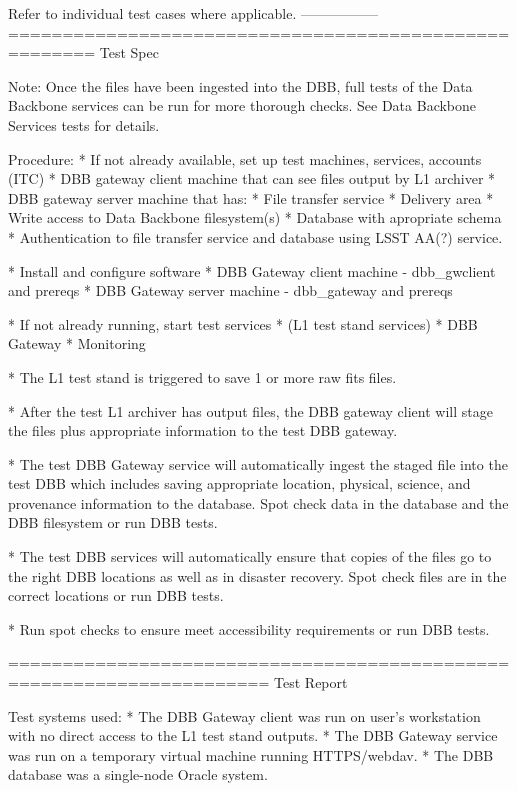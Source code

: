 \documentclass[DM,lsstdraft,STS,toc]{lsstdoc}
\begin{document}
Refer to individual test cases where applicable.
-----------------
======================================================
Test Spec

Note: Once the files have been ingested into the DBB, full tests of the 
   Data Backbone services can be run for more thorough
   checks.    See Data Backbone Services tests for details.    

Procedure:
* If not already available, set up test machines,
  services, accounts (ITC)
    * DBB gateway client machine that can see files output by L1 archiver
    * DBB gateway server machine that has:
        * File transfer service
        * Delivery area
        * Write access to Data Backbone filesystem(s)
    * Database with apropriate schema
    * Authentication to file transfer service and database using LSST AA(?) service.

* Install and configure software
    * DBB Gateway client machine - dbb_gwclient and prereqs
    * DBB Gateway server machine - dbb_gateway and prereqs

* If not already running, start test services
    * (L1 test stand services)
    * DBB Gateway
    * Monitoring

* The L1 test stand is triggered to save 1 or more raw fits files.

* After the test L1 archiver has output files,
  the DBB gateway client will stage the files plus appropriate
  information to the test DBB gateway.

* The test DBB Gateway service will automatically
  ingest the staged file into the test DBB which
  includes saving appropriate location, physical, science,
  and provenance information to the database.   Spot check data 
  in the database and the DBB filesystem or run DBB tests.

* The test DBB services will automatically ensure that
  copies of the files go to the right DBB locations as well
  as in disaster recovery.    Spot check files are in the correct 
  locations or run DBB tests.
 
* Run spot checks to ensure meet accessibility requirements or
 run DBB tests.


======================================================================
Test Report

Test systems used:
* The DBB Gateway client was run on user's workstation with no
direct access to the L1 test stand outputs.
* The DBB Gateway service was run on a temporary virtual machine
running HTTPS/webdav.
* The DBB database was a single-node Oracle system.
\end{document}

